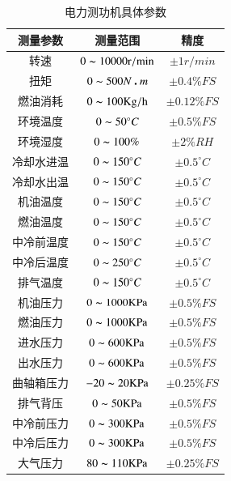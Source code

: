 \begin{table}[H] 
 	\centering 
 	\caption{电力测功机具体参数} 
 	\label{tab:dlcgjjtcs} 
 	\begin{tabular}{|c|c|c|} 
 	\hline 
 	测量参数 & 测量范围 & 精度\\\hline 
 	转速 & $0\thicksim10000\si{r/min}$ &$\pm 1\si{r/min}$ \\\hline 
 	扭矩 & $0\thicksim500N\centerdot m$ &$\pm 0.4\%\si{FS}$ \\\hline 
 	燃油消耗 &$0\thicksim100\si{Kg\per h}$ & $\pm 0.12\%\si{FS}$ \\\hline 
 	环境温度 &$0\thicksim50^{\circ}C$ & $\pm 0.5\%\si{FS}$ \\\hline 
 	环境湿度 &$0\thicksim100\%$ & $\pm 2\% RH$ \\\hline 
 	冷却水进温 &$0\thicksim150^{\circ}C$ & $\pm 0.5^{\circ}C$ \\\hline 
 	冷却水出温 &$0\thicksim150^{\circ}C$ & $\pm 0.5^{\circ}C$ \\\hline 
 	机油温度 &$0\thicksim150^{\circ}C$ & $\pm 0.5^{\circ}C$ \\\hline 
 	燃油温度 &$0\thicksim150^{\circ}C$ & $\pm 0.5^{\circ}C$ \\\hline 
 	中冷前温度 &$0\thicksim150^{\circ}C$ & $\pm 0.5^{\circ}C$ \\\hline 
 	中冷后温度 &$0\thicksim250^{\circ}C$ & $\pm 0.5^{\circ}C$ \\\hline 
 	排气温度 &$0\thicksim150^{\circ}C$ & $\pm 0.5^{\circ}C$ \\\hline 
 	机油压力 &$0\thicksim1000\si{KPa}$ & $\pm 0.5\%\si{FS}$ \\\hline 
 	燃油压力 &$0\thicksim1000\si{KPa}$ & $\pm 0.5\%\si{FS}$ \\\hline 
 	进水压力 &$0\thicksim600\si{KPa}$ & $\pm 0.5\%\si{FS}$ \\\hline 
 	出水压力 &$0\thicksim600\si{KPa}$ & $\pm 0.5\%\si{FS}$ \\\hline 
 	曲轴箱压力 &$-20\thicksim20\si{KPa}$ & $\pm 0.25\%\si{FS}$ \\\hline 
 	排气背压 &$0\thicksim50\si{KPa}$ & $\pm 0.5\%\si{FS}$ \\\hline 
 	中冷前压力 &$0\thicksim300\si{KPa}$ & $\pm 0.5\%\si{FS}$ \\\hline 
 	中冷后压力 &$0\thicksim300\si{KPa}$ & $\pm 0.5\%\si{FS}$ \\\hline 
 	大气压力 &$80\thicksim110\si{KPa}$ & $\pm 0.25\%\si{FS}$ \\\hline 
 	\end{tabular} 
\end{table} 
